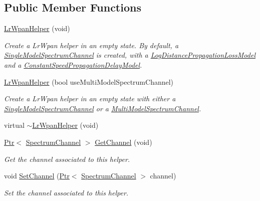 \subsection*{Public Member Functions}
\begin{DoxyCompactItemize}
\item 
\hyperlink{classns3_1_1LrWpanHelper_a9a59848a0844fcf1350436c4ddaf707a}{Lr\+Wpan\+Helper} (void)
\begin{DoxyCompactList}\small\item\em Create a Lr\+Wpan helper in an empty state. By default, a \hyperlink{classns3_1_1SingleModelSpectrumChannel}{Single\+Model\+Spectrum\+Channel} is created, with a \hyperlink{classns3_1_1LogDistancePropagationLossModel}{Log\+Distance\+Propagation\+Loss\+Model} and a \hyperlink{classns3_1_1ConstantSpeedPropagationDelayModel}{Constant\+Speed\+Propagation\+Delay\+Model}. \end{DoxyCompactList}\item 
\hyperlink{classns3_1_1LrWpanHelper_af3f2c4436140599d9faac6f1079285f5}{Lr\+Wpan\+Helper} (bool use\+Multi\+Model\+Spectrum\+Channel)
\begin{DoxyCompactList}\small\item\em Create a Lr\+Wpan helper in an empty state with either a \hyperlink{classns3_1_1SingleModelSpectrumChannel}{Single\+Model\+Spectrum\+Channel} or a \hyperlink{classns3_1_1MultiModelSpectrumChannel}{Multi\+Model\+Spectrum\+Channel}. \end{DoxyCompactList}\item 
virtual \hyperlink{classns3_1_1LrWpanHelper_acc5b9af0983428d79d92656496f65dd5}{$\sim$\+Lr\+Wpan\+Helper} (void)
\item 
\hyperlink{classns3_1_1Ptr}{Ptr}$<$ \hyperlink{classns3_1_1SpectrumChannel}{Spectrum\+Channel} $>$ \hyperlink{classns3_1_1LrWpanHelper_a9f055f5b1eca22c73129e9fdc626e2fe}{Get\+Channel} (void)
\begin{DoxyCompactList}\small\item\em Get the channel associated to this helper. \end{DoxyCompactList}\item 
void \hyperlink{classns3_1_1LrWpanHelper_a1c444c56b7d0c994118d0989fa9b9f5f}{Set\+Channel} (\hyperlink{classns3_1_1Ptr}{Ptr}$<$ \hyperlink{classns3_1_1SpectrumChannel}{Spectrum\+Channel} $>$ channel)
\begin{DoxyCompactList}\small\item\em Set the channel associated to this helper. \end{DoxyCompactList}\item 

\end{DoxyCompactItemize}

